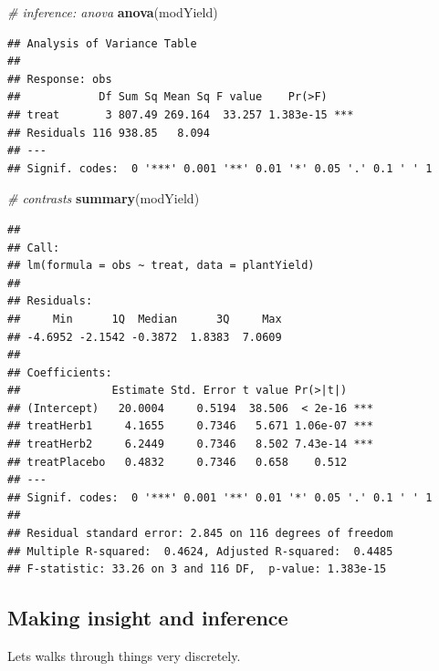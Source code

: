 \documentclass[
]{book}
\newenvironment{Shaded}{\begin{snugshade}}{\end{snugshade}}
\newcommand{\CommentTok}[1]{\textcolor[rgb]{0.56,0.35,0.01}{\textit{#1}}}
\newcommand{\FunctionTok}[1]{\textcolor[rgb]{0.13,0.29,0.53}{\textbf{#1}}}
\newcommand{\NormalTok}[1]{#1}
\begin{document}
\begin{Shaded}
\begin{Highlighting}[]
\CommentTok{\# inference: anova}
\FunctionTok{anova}\NormalTok{(modYield)}
\end{Highlighting}
\end{Shaded}

\begin{verbatim}
## Analysis of Variance Table
## 
## Response: obs
##            Df Sum Sq Mean Sq F value    Pr(>F)    
## treat       3 807.49 269.164  33.257 1.383e-15 ***
## Residuals 116 938.85   8.094                      
## ---
## Signif. codes:  0 '***' 0.001 '**' 0.01 '*' 0.05 '.' 0.1 ' ' 1
\end{verbatim}

\begin{Shaded}
\begin{Highlighting}[]
\CommentTok{\# contrasts}
\FunctionTok{summary}\NormalTok{(modYield)}
\end{Highlighting}
\end{Shaded}

\begin{verbatim}
## 
## Call:
## lm(formula = obs ~ treat, data = plantYield)
## 
## Residuals:
##     Min      1Q  Median      3Q     Max 
## -4.6952 -2.1542 -0.3872  1.8383  7.0609 
## 
## Coefficients:
##              Estimate Std. Error t value Pr(>|t|)    
## (Intercept)   20.0004     0.5194  38.506  < 2e-16 ***
## treatHerb1     4.1655     0.7346   5.671 1.06e-07 ***
## treatHerb2     6.2449     0.7346   8.502 7.43e-14 ***
## treatPlacebo   0.4832     0.7346   0.658    0.512    
## ---
## Signif. codes:  0 '***' 0.001 '**' 0.01 '*' 0.05 '.' 0.1 ' ' 1
## 
## Residual standard error: 2.845 on 116 degrees of freedom
## Multiple R-squared:  0.4624, Adjusted R-squared:  0.4485 
## F-statistic: 33.26 on 3 and 116 DF,  p-value: 1.383e-15
\end{verbatim}

\subsection{Making insight and inference}\label{making-insight-and-inference}

Lets walks through things very discretely.
\end{document}
